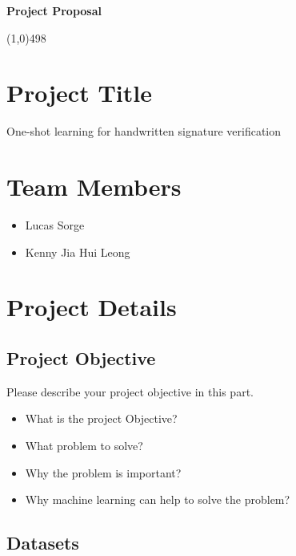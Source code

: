 \documentclass[11pt]{article}
\begin{document}
\begin{center}
{\Large \textbf{Project Proposal}}\\
\end{center}

\linethickness{1mm}\line(1,0){498}



\section{Project Title}

One-shot learning for handwritten signature verification

\section{Team Members}

\begin{itemize}
  \item Lucas Sorge
  \item Kenny Jia Hui Leong
\end{itemize}

\section{Project Details}

\subsection{Project Objective}

Please describe your project objective in this part.

\begin{itemize}
  \item What is the project Objective?
  \item What problem to solve?
  \item Why the problem is important?
  \item Why machine learning can help to solve the problem?
\end{itemize}

\subsection{Datasets}
\end{document}
